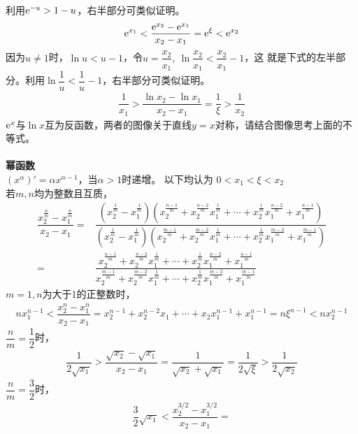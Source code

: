\begin{itemize}[leftmargin=\inteval{\myitemleftmargin}pt,itemsep=
   \inteval{\myitemitempsep}pt,topsep=\inteval{\myitemtopsep}pt]
利用$ \mathrm{e}^{-u}>1-u $，右半部分可类似证明。
\begin{align*}
    \mathrm{e}^{x_1}<\dfrac{\mathrm{e}^{x_2}-\mathrm{e}^{x_1}}{x_2-x_1} = \mathrm{e}^{\xi} <\mathrm{e}^{x_2} 	
\end{align*}
因为$ u\neq 1 $时，$ \ln u<u-1 $，令$ u=\dfrac{x_2}{x_1},\ \ln\dfrac{x_2}{x_1}< \dfrac{x_2}{x_1}-1 $，这
就是下式的左半部分。利用$ \ln \dfrac{1}{u}<\dfrac{1}{u}-1 $，右半部分可类似证明。
\begin{align*}
    \dfrac{1}{x_1}>\dfrac{\ln x_2-\ln x_1}{x_2-x_1}=\dfrac{1}{\xi} >\dfrac{1}{x_2}
\end{align*}
$ \mathrm{e}^x $与$ \ln x $互为反函数，两者的图像关于直线$ y=x $对称，请结合图像思考上面的不等式。\\
\\
\textbf{幂函数} \\
$ (x^{\alpha})'=\alpha x^{\alpha-1} $，当$ \alpha > 1 $时递增。
以下均认为 $ 0<x_1<\xi<x_2 $ \\
若$ m,n $均为整数且互质，
\begin{align*}
    \dfrac{x_2^{\frac{n}{m}}-x_1^{\frac{n}{m}}}{x_2-x_1} =&\dfrac{\left(x_2^{\frac{1}{m}} 
        -x_1^{\frac{1}{m}}\right) \left( x_2^{\frac{n-1}{m}}+x_2^{\frac{n-2}{m}}x_1^{\frac{1}{m}}
        + \cdots +x_2^{\frac{1}{m}}x_1^{\frac{n-2}{m}}+x_1^{\frac{n-1}{m}}\right) }{\left(
        x_2^{\frac{1}{m}} -x_1^{\frac{1}{m}} \right) \left(x_2^{\frac{m-1}{m}}+x_2^{\frac{m-2}{m}}
        x_1^{\frac{1}{m}}+ \cdots +x_2^{\frac{1}{m}}x_1^{\frac{m-2}{m}}+x_1^{\frac{m-1}{m}} \right) } \\
    =&\dfrac{x_2^{\frac{n-1}{m}}+x_2^{\frac{n-2}{m}}x_1^{\frac{1}{m}}+ \cdots 
        +x_2^{\frac{1}{m}}x_1^{\frac{n-2}{m}}+x_1^{\frac{n-1}{m}} }{x_2^{\frac{m-1}{m}}
        +x_2^{\frac{m-2}{m}}x_1^{\frac{1}{m}}+\cdots +x_2^{\frac{1}{m}}x_1^{\frac{m-2}{m}}
        +x_1^{\frac{m-1}{m}} }
\end{align*}
$ m=1,n $为大于1的正整数时，
\begin{align*}
    nx_1^{n-1}<\dfrac{x_2^n-x_1^n}{x_2-x_1}=x_2^{n-1}+x_2^{n-2}x_1+\cdots +
    x_2x_1^{n-1}+x_1^{n-1}=n\xi^{n-1} < nx_2^{n-1}
\end{align*}
$ \dfrac{n}{m}=\dfrac{1}{2} $时，
\begin{align*}
    \dfrac{1}{2\sqrt{x_1}}>\dfrac{\sqrt{x_2}-\sqrt{x_1}}{x_2-x_1}=\dfrac{1}{\sqrt{x_2}+\sqrt{x_1}}
    =\dfrac{1}{2\sqrt{\xi}}>\dfrac{1}{2\sqrt{x_2}}
\end{align*} 
$ \dfrac{n}{m}=\dfrac{3}{2} $时，
\begin{align*}
    \dfrac{3}{2}\sqrt{x_1}< \dfrac{x_2^{3/2}-x_1^{3/2}}{x_2-x_1}=

\end{align*}
\end{itemize}
